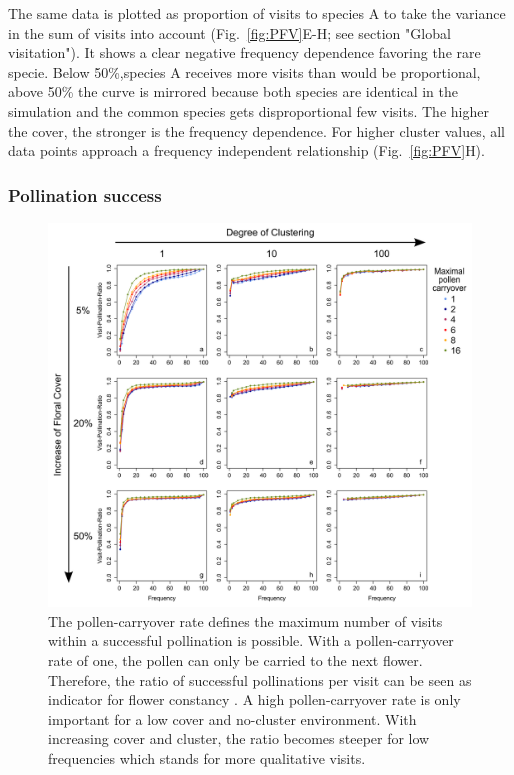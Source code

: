 The same data is plotted as proportion of visits to species A to take the variance in the sum of visits into account (Fig.~\ref{fig:PFV}E-H; see section "Global visitation"). It shows a clear negative frequency dependence favoring the rare specie. Below 50\%,species A receives more visits than would be proportional, above 50\% the curve is mirrored because both species are identical in the simulation and the common species gets disproportional few visits. The higher the cover, the stronger is the frequency dependence. For higher cluster values, all data points approach a frequency independent relationship (Fig.~\ref{fig:PFV}H). 

\subsubsection*{Pollination success}

\begin{figure} [!ht] %
	\centering
	\includegraphics[width=15cm]{Images/POC}
	\caption{The pollen-carryover rate defines the maximum number of visits within a successful pollination is possible. With a pollen-carryover rate of one, the pollen can only be carried to the next flower. Therefore, the ratio of successful pollinations per visit can be seen as indicator for flower constancy \citep{montgomery2009pollen}. A high pollen-carryover rate is only important for a low cover and no-cluster environment. With increasing cover and cluster, the ratio becomes steeper for low frequencies which stands for more qualitative visits.}
	\label{fig:POC}
\end{figure}

